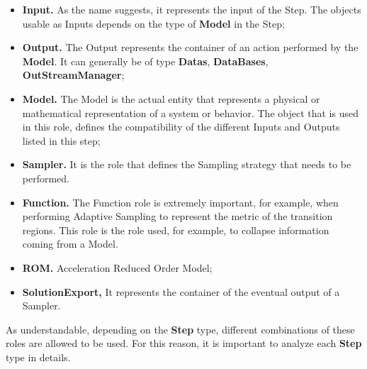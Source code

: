 \begin{itemize}
\item \textbf{Input.} As the name suggests, it represents the input of the Step. The objects usable as Inputs depends on the type of \textbf{Model} in the Step;
\item \textbf{Output.} The Output represents the container of an action performed by the \textbf{Model}. It can generally be of type \textbf{Datas}, \textbf{DataBases}, \textbf{OutStreamManager};
\item \textbf{Model.} The Model is the actual entity that represents a physical or mathematical representation of a system or behavior. The object that is used in this role, defines the compatibility of the different Inputs and Outputs listed in this step;
\item \textbf{Sampler.} It is the role that defines the Sampling strategy that needs to be performed. 
\item \textbf{Function.} The Function role is extremely important, for example, when performing Adaptive Sampling to represent the metric of the transition regions. This role is the role used, for example, to collapse information coming from a Model.
\item \textbf{ROM.} Acceleration Reduced Order Model;
\item \textbf{SolutionExport,} It represents the container of the eventual output of a Sampler.
\end{itemize}
As understandable, depending on the \textbf{Step} type, different combinations of these roles are allowed to be used.
For this reason, it is important to analyze each \textbf{Step} type in details.

